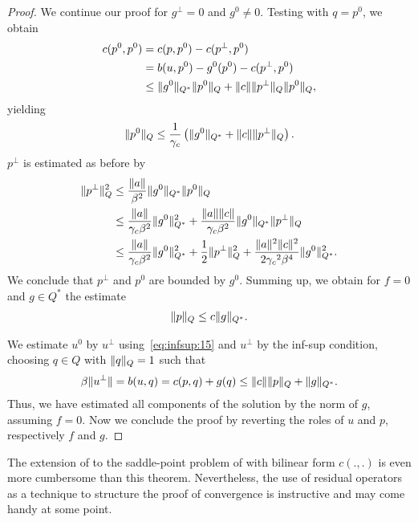 \begin{proof}
  We continue our proof for $g^\perp=0$ and $g^0 \neq 0$. Testing with
  $q=p^0$, we obtain
  \begin{align*}
    c(p^0,p^0)
    &= c(p,p^0) - c(p^\perp,p^0) \\
    &= b(u,p^0) - g^0(p^0) - c(p^\perp,p^0) \\
    &\le \lVert g^0\rVert_{Q^*} \lVert p^0\rVert_Q
      + \lVert c\rVert \lVert p^\perp\rVert_Q \lVert p^0\rVert_Q,
  \end{align*}
  yielding
  \begin{gather*}
    \lVert p^0\rVert_Q \le \frac1{\gamma_c}
    \left(\lVert g^0\rVert_{Q^*} + \lVert c\rVert \lVert p^\perp\rVert_Q\right).
  \end{gather*}
  $p^\perp$ is estimated as before by
  \begin{align*}
    \lVert p^\perp\rVert_Q^2
    &\le \frac{\lVert a\rVert}{\beta^2}\lVert g^0\rVert_{Q^*} \lVert p^0\rVert_Q \\
    &\le \frac{\lVert a\rVert}{\gamma_c\beta^2} \lVert g^0\rVert_{Q^*}^2
      + \frac{\lVert a\rVert\lVert c\rVert}{\gamma_c\beta^2}
      \lVert g^0\rVert_{Q^*}\lVert p^\perp\rVert_Q\\
    &\le \frac{\lVert a\rVert}{\gamma_c\beta^2} \lVert g^0\rVert_{Q^*}^2
      + \frac12 \lVert p^\perp\rVert_Q^2
      + \frac{\lVert a\rVert^2 \lVert c\rVert^2}{2{\gamma_c}^2\beta^4} \lVert g^0\rVert_{Q^*}^2.
  \end{align*}
  We conclude that $p^\perp$ and $p^0$ are bounded by $g^0$. Summing
  up, we obtain for $f=0$ and $g\in Q^*$ the estimate
  \begin{gather*}
    \lVert p\rVert_Q \le c \lVert g\rVert_{Q^*}.
  \end{gather*}

  We estimate $u^0$ by $u^\perp$ using~\eqref{eq:infsup:15} and
  $u^\perp$ by the inf-sup condition, choosing $q\in Q$ with
  $\lVert q\rVert_Q = 1$ such that
  \begin{gather*}
    \beta\lVert u^\perp\rVert = b(u,q) = c(p,q) + g(q)
    \le \lVert c\rVert\lVert p\rVert_Q +  \lVert g\rVert_{Q^*}.
  \end{gather*}
  Thus, we have estimated all components of the solution by the norm
  of $g$, assuming $f=0$. Now we conclude the proof by reverting the
  roles of $u$ and $p$, respectively $f$ and $g$.
\end{proof}

\begin{intro}
  The extension of  to the
  saddle-point problem of 
  with bilinear form $c(.,.)$ is even more cumbersome than this
  theorem. Nevertheless, the use of residual operators as a technique
  to structure the proof of convergence is instructive and may come
  handy at some point.
\end{intro}

